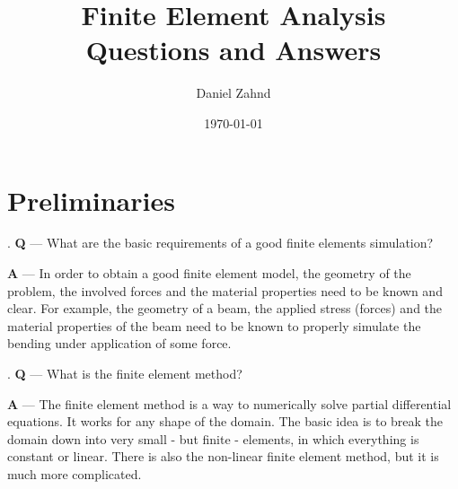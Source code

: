 \documentclass[a4paper,11pt]{article}
\title{Finite Element Analysis\\ \vspace{0.2cm}\normalsize Questions and Answers}
\author{Daniel Zahnd}
\date{\today}
\newcounter{question}
\numberwithin{equation}{section}
\begin{document}
\newcommand\Que[1]{%
   \leavevmode\par
   \stepcounter{question}
   \noindent
   \thequestion. \textbf{Q} --- #1\par}

\newcommand\Ans[2][]{%
    \leavevmode\par\noindent
   {\leftskip0pt
    \textbf{A} --- \textbf{#1}#2\par}}

\maketitle
\tableofcontents

\setcounter{page}{1}

\section{Preliminaries}
\Que{What are the basic requirements of a good finite elements simulation?}
\Ans{
In order to obtain a good finite element model, the geometry of the problem, the involved forces and the material properties need to be known and clear. For example, the geometry of a beam, the applied stress (forces) and the material properties of the beam need  to be known to properly simulate the bending under application of some force.
}

\Que{What is the finite element method?}
\Ans{
The finite element method is a way to numerically solve partial differential equations. It works for any shape of the domain. The basic idea is to break the domain down into very small - but finite - elements, in which everything is constant or linear. There is also the non-linear finite element method, but it is much more complicated.
}
\end{document}
